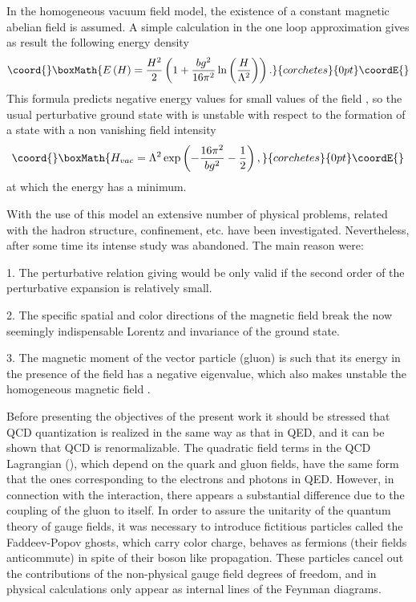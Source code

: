 \documentclass[12pt,letterpaper]{report}
\begin{document}
In the homogeneous vacuum field model, the existence of a constant
magnetic abelian field \coordHE{} is assumed. A simple calculation in the
one loop approximation gives as result the following energy
density \cite{Shuryak}
\[\coord{}\boxMath{
E\left(H\right) =\frac{H^2}2\left(1+\frac{bg^2}{16\pi ^2}\ln
\left(\frac H{\Lambda ^2}\right) \right).
}{corchetes}{0pt}\coordE{}\]
This formula predicts negative energy values for small values of
the field \coordHE{}, so the usual perturbative ground state with \coordHE{}
is unstable with respect to the formation of a state with a non
vanishing field intensity \cite{Shuryak}
\[\coord{}\boxMath{
H_{vac}=\Lambda ^2\exp \left(-\frac{16\pi ^2}{bg^2}-\frac
12\right),
}{corchetes}{0pt}\coordE{}\]
at which the energy \coordHE{} has a minimum.

With the use of this model an extensive number of physical
problems, related with the hadron structure, confinement, etc.
have been investigated. Nevertheless, after some time its intense
study was abandoned. The main reason were:

1. The perturbative relation giving \coordHE{} would be only valid
if the second order of the perturbative expansion is relatively
small.

2. The specific spatial and color directions of the magnetic field
break the now seemingly indispensable Lorentz and \coordHE{}
invariance of the ground state.

3. The magnetic moment of the vector particle (gluon) is such that
its energy in the presence of the field has a negative eigenvalue,
which also makes unstable the homogeneous magnetic field \coordHE{}.

Before presenting the objectives of the present work it should be
stressed that QCD quantization \cite{Faddeev-Popov} is realized in
the same way as that in QED, and it can be shown that QCD is
renormalizable. The quadratic field terms in the QCD Lagrangian
(\coordHE{}), which depend on the quark and gluon fields, have the
same form that the ones corresponding to the electrons and photons
in QED. However, in connection with the interaction, there appears
a substantial difference due to the coupling of the gluon to
itself. In order to assure the unitarity of the quantum theory of
gauge fields, it was necessary to introduce fictitious particles
called the Faddeev-Popov ghosts, which carry color charge, behaves
as fermions (their fields anticommute) in spite of their boson
like propagation. These particles cancel out the contributions of
the non-physical gauge field degrees of freedom, and in physical
calculations only appear as internal lines of the Feynman
diagrams.
\end{document}
